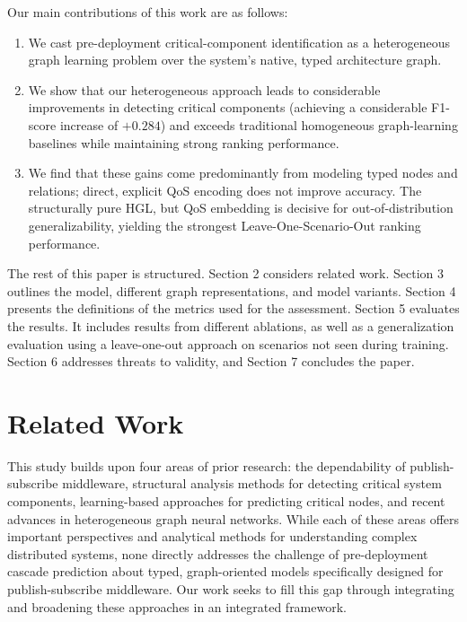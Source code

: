 \documentclass[sigconf,9pt,anonymous]{acmart}
\begin{document}
Our main contributions of this work are as follows:

\begin{enumerate}

    \item We cast pre-deployment critical-component identification as a heterogeneous graph learning problem over the system's native, typed architecture graph.
    \item We show that our heterogeneous approach leads to considerable improvements in detecting critical components (achieving a considerable F1-score increase of $+0.284$) and exceeds traditional homogeneous graph-learning baselines while maintaining strong ranking performance.

    \item We find that these gains come predominantly from modeling typed nodes and relations; direct, explicit QoS encoding does not improve accuracy. The structurally pure HGL, but QoS embedding is decisive for out-of-distribution generalizability, yielding the strongest Leave-One-Scenario-Out ranking performance.
\end{enumerate}

The rest of this paper is structured. Section 2 considers related work. Section 3 outlines the model, different graph representations, and model variants. Section 4 presents the definitions of the metrics used for the assessment. Section 5 evaluates the results. It includes results from different ablations, as well as a generalization evaluation using a leave-one-out approach on scenarios not seen during training. Section 6 addresses threats to validity, and Section 7 concludes the paper.

\section{Related Work}

This study builds upon four areas of prior research: the dependability of publish-subscribe middleware, structural analysis methods for detecting critical system components, learning-based approaches for predicting critical nodes, and recent advances in heterogeneous graph neural networks. While each of these areas offers important perspectives and analytical methods for understanding complex distributed systems, none directly addresses the challenge of pre-deployment cascade prediction about typed, graph-oriented models specifically designed for publish-subscribe middleware. Our work seeks to fill this gap through integrating and broadening these approaches in an integrated framework.
\end{document}
